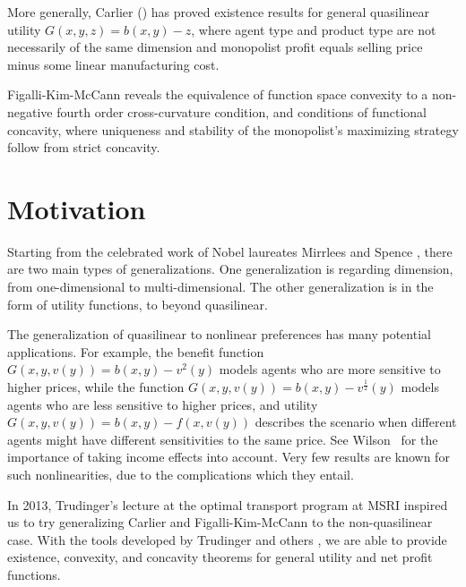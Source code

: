 More generally, Carlier (\cite{Carlier01}) has proved existence results for general quasilinear utility  $G(x,y,z) = b(x,y)- z$, where agent type and product type are not necessarily of the same dimension and monopolist profit equals selling price minus some linear manufacturing cost.\medskip

Figalli-Kim-McCann \cite{FigalliKimMcCann11} reveals the equivalence of function space convexity to a non-negative fourth order cross-curvature condition, and conditions of functional concavity, where uniqueness and stability of the monopolist's maximizing strategy follow from strict concavity.\medskip



\section{Motivation}

Starting from the celebrated work of Nobel laureates Mirrlees \cite{Mirrlees71} and Spence \cite{Spence74}, there are two main types of generalizations. One generalization is regarding dimension, from one-dimensional to multi-dimensional. The other generalization is in the form of utility functions, to beyond quasilinear.\medskip

The generalization of quasilinear to nonlinear preferences has many potential applications. For example, the benefit function $G(x,y,v(y))=b(x,y) -v^2(y)$ models agents who are more sensitive to higher prices, while the function $G(x,y,v(y))=b(x,y)-v^{\frac{1}{2}}(y)$ models agents who are less sensitive to higher prices, and utility $G(x,y,v(y))=b(x,y) -f(x, v(y))$ describes the scenario when different agents might have different sensitivities to the same price. See Wilson~\cite[Chapter 7]{Wilson93} for the importance of taking income effects into account. 
Very few results are known for such nonlinearities,  due to the complications which they entail. \medskip


	In 2013, Trudinger's lecture at the optimal transport program at MSRI inspired us to try generalizing Carlier \cite{Carlier01} and Figalli-Kim-McCann \cite{FigalliKimMcCann11} to the non-quasilinear case. With the tools developed by Trudinger \cite{Trudinger14} and others  \cite{Balder77, Singer97}, we are able to provide existence, convexity, and concavity theorems for general utility and net profit functions. \medskip

